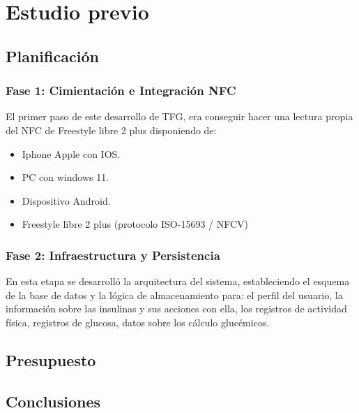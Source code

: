 \chapter{Estudio previo}\label{cap:planificación}

\section{Planificación}

\subsection{Fase 1: Cimientación e Integración NFC}

El primer paso de este desarrollo de TFG, era conseguir hacer una lectura propia del NFC de Freestyle libre 2 plus disponiendo de:


\begin{itemize}
    \item Iphone Apple con IOS.
    \item PC con windows 11.
    \item Dispositivo Android.
    \item Freestyle libre 2 plus (protocolo ISO-15693 / NFCV)
\end{itemize}

\subsection{Fase 2: Infraestructura y Persistencia}

En esta etapa se desarrolló la arquitectura del sistema, estableciendo el esquema de la base de datos y la lógica de almacenamiento para: el perfil del usuario, la información sobre las insulinas y sus acciones con ella,  los registros de actividad física, registros de glucosa, datos sobre los cálculo glucémicos.

\section{Presupuesto}

\section{Conclusiones}